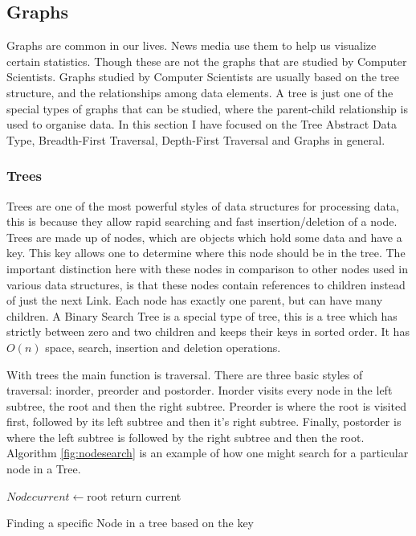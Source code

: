 \documentclass[10pt,twocolumn]{IEEEtran}
\begin{document}
	\subsection{Graphs}
	Graphs are common in our lives. News media use them to help us visualize certain statistics. Though these are not the graphs that are studied by Computer Scientists. Graphs studied by Computer Scientists are usually based on the tree structure, and the relationships 	among data elements. A tree is just one of the special types of graphs that can be studied, where the parent-child relationship is used to organise data. In this section I have focused on the Tree Abstract Data Type, Breadth-First Traversal, Depth-First Traversal and Graphs in general. \\
	\subsubsection{Trees}
	Trees are one of the most powerful styles of data structures for processing data, this is because they allow rapid searching and fast insertion/deletion of a node. Trees are made up of nodes, which are objects which hold some data and have a key. This key allows one to determine where this node should be in the tree. The important distinction here with these nodes in comparison to other nodes used in various data structures, is that these nodes contain references to children instead of just the next Link. Each node has exactly one parent, but can have many children. A Binary Search Tree is a special type of tree, this is a tree which has strictly between zero and two children and keeps their keys in sorted order. It has $O(n)$ space, search, insertion and deletion operations. 
	\par With trees the main function is traversal. There are three basic styles of traversal: inorder, preorder and postorder. Inorder visits every node in the left subtree, the root and then the right subtree. Preorder is where the root is visited first, followed by its left subtree and then it's right subtree. Finally, postorder is where the left subtree is followed by the right subtree and then the root. \\
Algorithm \ref{fig:nodesearch} is an example of how one might search for a particular node in a Tree.\\
\IncMargin{1em}
\begin{algorithm}
	\SetAlgoLined
	$Node current \longleftarrow$root\;
return current\;
\caption{Finding a specific Node in a tree based on the key}
\label{fig:nodesearch}
\end{algorithm}\DecMargin{1em}
\end{document}
